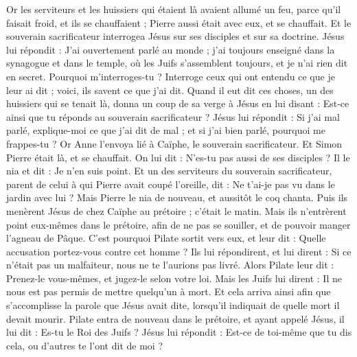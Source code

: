 \begin{multicols}{2}
Or les serviteurs et les huissiers qui étaient là avaient allumé un feu, parce qu'il faisait froid, et ils se chauffaient ; Pierre aussi était avec eux, et se chauffait.
Et le souverain sacrificateur interrogea Jésus sur ses disciples et sur sa doctrine.
Jésus lui répondit : J'ai ouvertement parlé au monde ; j'ai toujours enseigné dans la synagogue et dans le temple, où les Juifs s'assemblent toujours, et je n'ai rien dit en secret.
Pourquoi m'interroges-tu ? Interroge ceux qui ont entendu ce que je leur ai dit ; voici, ils savent ce que j'ai dit.
Quand il eut dit ces choses, un des huissiers qui se tenait là, donna un coup de sa verge à Jésus en lui disant : Est-ce ainsi que tu réponds au souverain sacrificateur ?
Jésus lui répondit : Si j'ai mal parlé, explique-moi ce que j'ai dit de mal ; et si j'ai bien parlé, pourquoi me frappes-tu ?
Or Anne l'envoya lié à Caïphe, le souverain sacrificateur.
Et Simon Pierre était là, et se chauffait. On lui dit : N'es-tu pas aussi de ses disciples ? Il le nia et dit : Je n'en suis point.
Et un des serviteurs du souverain sacrificateur, parent de celui à qui Pierre avait coupé l'oreille, dit : Ne t'ai-je pas vu dans le jardin avec lui ?
Mais Pierre le nia de nouveau, et aussitôt le coq chanta.
Puis ils menèrent Jésus de chez Caïphe au prétoire ; c'était le matin. Mais ils n'entrèrent point eux-mêmes dans le prétoire, afin de ne pas se souiller, et de pouvoir manger l'agneau de Pâque.
C'est pourquoi Pilate sortit vers eux, et leur dit : Quelle accusation portez-vous contre cet homme ?
Ils lui répondirent, et lui dirent : Si ce n'était pas un malfaiteur, nous ne te l'aurions pas livré.
Alors Pilate leur dit : Prenez-le vous-mêmes, et jugez-le selon votre loi. Mais les Juifs lui dirent : Il ne nous est pas permis de mettre quelqu'un à mort.
Et cela arriva ainsi afin que s'accomplisse la parole que Jésus avait dite, lorsqu'il indiquait de quelle mort il devait mourir.
Pilate entra de nouveau dans le prétoire, et ayant appelé Jésus, il lui dit : Es-tu le Roi des Juifs ?
Jésus lui répondit : Est-ce de toi-même que tu dis cela, ou d'autres te l'ont dit de moi ?

\end{multicols}
